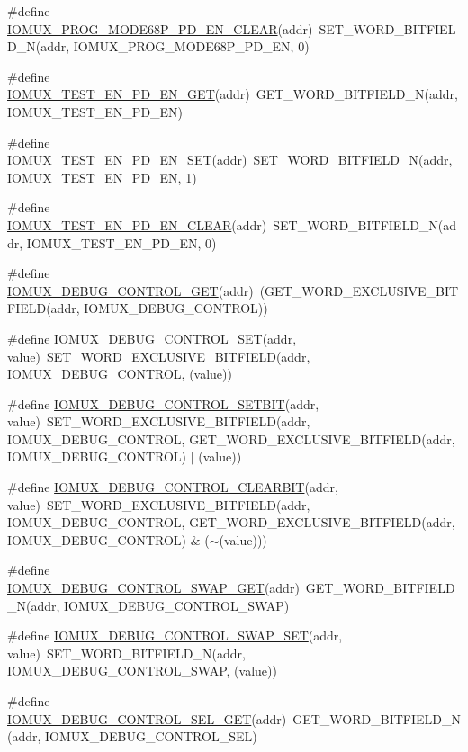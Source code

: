 \begin{DoxyCompactItemize}
\#define \hyperlink{a00559_a6acab3de69ce57a649c2aa1a2159485a}{IOMUX\_\-PROG\_\-MODE68P\_\-PD\_\-EN\_\-CLEAR}(addr)~SET\_\-WORD\_\-BITFIELD\_\-N(addr, IOMUX\_\-PROG\_\-MODE68P\_\-PD\_\-EN, 0)
\item 
\#define \hyperlink{a00559_a0a22a7c6b81fde24a547f1872877cb57}{IOMUX\_\-TEST\_\-EN\_\-PD\_\-EN\_\-GET}(addr)~GET\_\-WORD\_\-BITFIELD\_\-N(addr, IOMUX\_\-TEST\_\-EN\_\-PD\_\-EN)
\item 
\#define \hyperlink{a00559_aa6a190a95905def9e158930a7ffc16e0}{IOMUX\_\-TEST\_\-EN\_\-PD\_\-EN\_\-SET}(addr)~SET\_\-WORD\_\-BITFIELD\_\-N(addr, IOMUX\_\-TEST\_\-EN\_\-PD\_\-EN, 1)
\item 
\#define \hyperlink{a00559_a8bcf69aba98bb385598021af1981c297}{IOMUX\_\-TEST\_\-EN\_\-PD\_\-EN\_\-CLEAR}(addr)~SET\_\-WORD\_\-BITFIELD\_\-N(addr, IOMUX\_\-TEST\_\-EN\_\-PD\_\-EN, 0)
\item 
\#define \hyperlink{a00559_a147303ceefd6e1911d7fe8e795e87ebf}{IOMUX\_\-DEBUG\_\-CONTROL\_\-GET}(addr)~(GET\_\-WORD\_\-EXCLUSIVE\_\-BITFIELD(addr, IOMUX\_\-DEBUG\_\-CONTROL))
\item 
\#define \hyperlink{a00559_af65d42304d08acd5c40e47df865214cc}{IOMUX\_\-DEBUG\_\-CONTROL\_\-SET}(addr, value)~SET\_\-WORD\_\-EXCLUSIVE\_\-BITFIELD(addr, IOMUX\_\-DEBUG\_\-CONTROL, (value))
\item 
\#define \hyperlink{a00559_a1ef3f58ca2b63c661f215ee3e926de02}{IOMUX\_\-DEBUG\_\-CONTROL\_\-SETBIT}(addr, value)~SET\_\-WORD\_\-EXCLUSIVE\_\-BITFIELD(addr, IOMUX\_\-DEBUG\_\-CONTROL, GET\_\-WORD\_\-EXCLUSIVE\_\-BITFIELD(addr, IOMUX\_\-DEBUG\_\-CONTROL) $|$ (value))
\item 
\#define \hyperlink{a00559_a824745c2c5bec704f120fb678cc5092c}{IOMUX\_\-DEBUG\_\-CONTROL\_\-CLEARBIT}(addr, value)~SET\_\-WORD\_\-EXCLUSIVE\_\-BITFIELD(addr, IOMUX\_\-DEBUG\_\-CONTROL, GET\_\-WORD\_\-EXCLUSIVE\_\-BITFIELD(addr, IOMUX\_\-DEBUG\_\-CONTROL) \& ($\sim$(value)))
\item 
\#define \hyperlink{a00559_a2b19287e539e37b6149640db1be780ea}{IOMUX\_\-DEBUG\_\-CONTROL\_\-SWAP\_\-GET}(addr)~GET\_\-WORD\_\-BITFIELD\_\-N(addr, IOMUX\_\-DEBUG\_\-CONTROL\_\-SWAP)
\item 
\#define \hyperlink{a00559_a15c739417285ef12eb8e1a7846ccac01}{IOMUX\_\-DEBUG\_\-CONTROL\_\-SWAP\_\-SET}(addr, value)~SET\_\-WORD\_\-BITFIELD\_\-N(addr, IOMUX\_\-DEBUG\_\-CONTROL\_\-SWAP, (value))
\item 
\#define \hyperlink{a00559_a06001e4cf4119c4264090dfd09a8d98d}{IOMUX\_\-DEBUG\_\-CONTROL\_\-SEL\_\-GET}(addr)~GET\_\-WORD\_\-BITFIELD\_\-N(addr, IOMUX\_\-DEBUG\_\-CONTROL\_\-SEL)

\end{DoxyCompactItemize}
